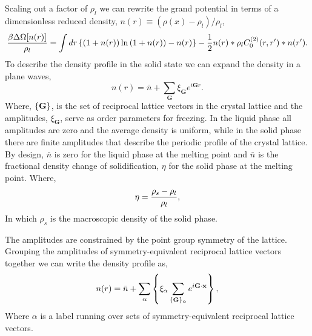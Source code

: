 Scaling out a factor of $\rho_l$ we can rewrite the grand potential in terms of
a dimensionless reduced density, $n(r) \equiv (\rho(x) - \rho_l)/\rho_l$,
%
\begin{equation}
    \label{gp}
    \frac{\beta \Delta \Omega[n(r)]}{\rho_l} =
        \int dr \left\lbrace 
            (1 + n(r))\ln\left(1 + n(r)\right) - n(r)\right\rbrace
        - \frac{1}{2} n(r) \ast \rho_l C^{(2)}_0(r, r^\prime) \ast n(r^\prime).
\end{equation}
%
To describe the density profile in the solid state we can expand the density
in a plane waves,
%
\begin{equation}
    \label{expansion}
    n(r) = \bar{n} + \sum_{\mathbf{G}} \xi_{\mathbf{G}} e^{i \mathbf{G} r}.
\end{equation}
%
Where, $\left\lbrace \mathbf{G} \right\rbrace$, is the set of reciprocal lattice
vectors in the crystal lattice and the amplitudes, $\xi_\mathbf{G}$, serve as
order parameters for freezing. In the liquid phase all amplitudes are zero and
the average density is uniform, while in the solid phase there are finite
amplitudes that describe the periodic profile of the crystal lattice. By
design, $\bar{n}$ is zero for the liquid phase at the melting point and
$\bar{n}$ is the fractional density change of solidification, $\eta$ for the
solid phase at the melting point. Where,
%
\begin{equation}
    \label{eq:eta_def} 
    \eta = \frac{\rho_s - \rho_l}{\rho_l},
\end{equation}
%
In which $\rho_s$ is the macroscopic density of the solid phase.

The amplitudes are constrained by the point group symmetry of the lattice.
Grouping the amplitudes of symmetry-equivalent reciprocal lattice vectors
together we can write the density profile as,
%
\begin{equation}
    \label{amplitudes}
    n(r) = \bar{n}
         + \sum_\alpha \left\lbrace
            \xi_\alpha \sum_{\lbrace\mathbf{G}\rbrace_\alpha}
                e^{i\mathbf{G} \cdot \mathbf{x}}\right\rbrace,
\end{equation}
%
Where $\alpha$ is a label running over sets of symmetry-equivalent reciprocal
lattice vectors.

